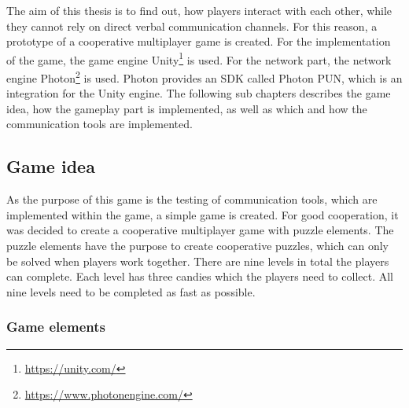The aim of this thesis is to find out, how players interact with each other, while they cannot rely on direct verbal communication channels.
For this reason, a prototype of a cooperative multiplayer game is created.
For the implementation of the game, the game engine Unity\footnote{\url{https://unity.com/}}
is used. 
For the network part, the network engine Photon\footnote{\url{https://www.photonengine.com/}} is used. Photon provides an SDK called Photon PUN, which is an integration for the Unity engine.
The following sub chapters describes the game idea, how the gameplay part is implemented, as well as which and how the communication tools are implemented.



\subsection{Game idea}
\label{section:Game idea}
As the purpose of this game is the testing of communication tools, which are implemented within the game, a simple game is created.
For good cooperation, it was decided to create a cooperative multiplayer game with puzzle elements. The puzzle elements have the purpose to create cooperative puzzles, which can only be solved when players work together. There are nine levels in total the players can complete. Each level has three candies which the players need to collect. All nine levels need to be completed as fast as possible.

\subsubsection{Game elements}
\label{section:Game elements}


